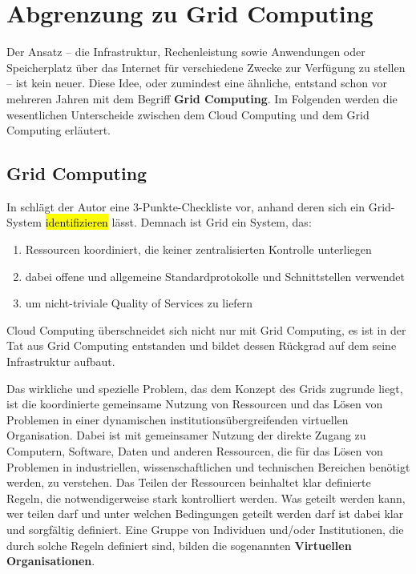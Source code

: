 \section{Abgrenzung zu Grid Computing}
Der Ansatz -- die Infrastruktur, Rechenleistung sowie Anwendungen oder Speicherplatz über das Internet für verschiedene Zwecke zur Verfügung zu stellen -- ist kein neuer.
Diese Idee, oder zumindest eine ähnliche, entstand schon vor mehreren Jahren mit dem Begriff \textbf{Grid Computing}.
Im Folgenden werden die wesentlichen Unterscheide zwischen dem Cloud Computing und dem Grid Computing erläutert.
 
\subsection{Grid Computing}
In \cite{grid-checklist} schlägt der Autor eine 3-Punkte-Checkliste vor, anhand deren sich ein Grid-System \hl{identifizieren} lässt. Demnach ist Grid ein System, das:
\begin{enumerate}
  \item Ressourcen koordiniert, die keiner zentralisierten Kontrolle unterliegen
  \item dabei offene und allgemeine Standardprotokolle und Schnittstellen verwendet
  \item um nicht-triviale \glqq Quality of Services\grqq{} zu liefern
\end{enumerate}

Cloud Computing überschneidet sich nicht nur mit Grid Computing, es ist in der Tat aus Grid Computing entstanden und bildet dessen Rückgrad auf dem seine Infrastruktur aufbaut\cite{360-degree-compared}.

Das wirkliche und spezielle Problem, das dem Konzept des Grids zugrunde liegt,
ist die koordinierte gemeinsame Nutzung von Ressourcen und das Lösen von Problemen
in einer dynamischen institutionsübergreifenden virtuellen Organisation.
Dabei ist mit \glqq gemeinsamer Nutzung\grqq{} der direkte Zugang zu Computern, Software, Daten und anderen Ressourcen,
die für das Lösen von Problemen in industriellen, wissenschaftlichen und technischen Bereichen benötigt werden, zu verstehen.
Das Teilen der Ressourcen beinhaltet klar definierte Regeln, die notwendigerweise stark kontrolliert werden.
Was geteilt werden kann, wer teilen darf und unter welchen Bedingungen geteilt werden darf ist dabei klar und sorgfältig definiert.
Eine Gruppe von Individuen und/oder Institutionen, die durch solche Regeln definiert sind,
bilden die sogenannten \textbf{Virtuellen Organisationen}.\cite{anatomy-of-grid}

